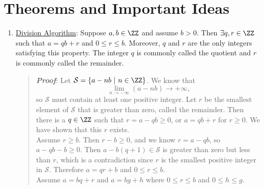 \documentclass{hw}
\newcommand{\Define}[1]{\item\underline{#1}:}
\newcommand{\set}[1]{\mathcal{#1}}
\begin{document}
\newpage
\section{Theorems and Important Ideas}
\begin{enumerate}
\Define{Division Algorithm} Suppose $a,b\in\ZZ$ and assume $b>0$. Then $\exists q,r\in\ZZ$ such that
$a=qb+r$ and $0\leq r\leq b$. Moreover, $q$ and $r$ are the only integers satisfying this property.
The integer $q$ is commonly called the quotient and $r$ is commonly called the remainder.
\begin{quote}
\textit{\textbf{Proof}}: Let $\set{S}=\{a-nb\ |\ n\in\ZZ\}$. We know that
\[
\lim_{n\to-\infty}(a-nb)\to+\infty,
\]
so $\set{S}$ must contain at least one positive integer. Let $r$ be the smallest element of $\set{S}$
that is greater than zero, called the remainder. Then there is a $q\in\ZZ$ such that $r=a-qb\geq0$, or
$a=qb+r$ for $r\geq0$. We have shown that this $r$ exists.\\
Assume $r\geq b$. Then $r-b\geq0$, and we know $r=a-qb$, so $a-qb-b\geq 0$. Then $a-b(q+1)\in\set{S}$
is greater than zero but less than $r$, which is a contradiction since $r$ is the smallest positive
integer in $\set{S}$. Therefore $a=qr+b$ and $0\leq r\leq b$.\\
Assume $a=bq+r$ and $a=bg+h$ where $0\leq r\leq b$ and $0\leq h\leq g$.
\end{quote}
\end{enumerate}
\end{document}
